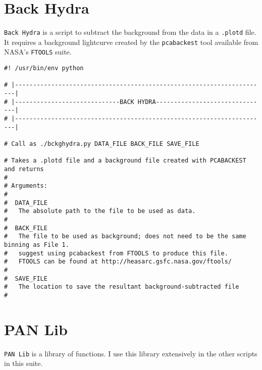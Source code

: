 \section{Back Hydra}

\par \texttt{Back Hydra} is a script to subtract the background from the data in a \texttt{.plotd} file.  It requires a background lightcurve created by the \texttt{pcabackest} tool available from NASA's \texttt{FTOOLS} suite.

\begin{verbatim}
#! /usr/bin/env python

# |----------------------------------------------------------------------|
# |-----------------------------BACK HYDRA-------------------------------|
# |----------------------------------------------------------------------|

# Call as ./bckghydra.py DATA_FILE BACK_FILE SAVE_FILE

# Takes a .plotd file and a background file created with PCABACKEST and returns
#
# Arguments:
#
#  DATA_FILE
#   The absolute path to the file to be used as data.
#
#  BACK_FILE
#   The file to be used as background; does not need to be the same binning as File 1.
#   suggest using pcabackest from FTOOLS to produce this file.
#   FTOOLS can be found at http://heasarc.gsfc.nasa.gov/ftools/
#
#  SAVE_FILE
#   The location to save the resultant background-subtracted file
#
\end{verbatim}

\section{PAN Lib}

\par \texttt{PAN Lib} is a library of functions.  I use this library extensively in the other scripts in this suite.

